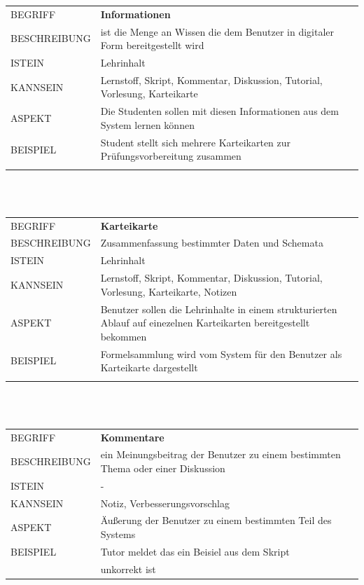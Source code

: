 \documentclass[12pt,a4paper]{article}
\begin{document}
\begin{tabular}{l p{12cm}}
BEGRIFF 	 & \textbf{Informationen} \\ 
BESCHREIBUNG & ist die Menge an Wissen die dem Benutzer in digitaler Form bereitgestellt wird\\ 
ISTEIN   	 & Lehrinhalt\\
KANNSEIN 	 & Lernstoff, Skript, Kommentar, Diskussion, Tutorial, Vorlesung, Karteikarte\\ 
ASPEKT   	 & Die Studenten sollen mit diesen Informationen aus dem System lernen können\\
BEISPIEL 	 & Student stellt sich mehrere Karteikarten zur Prüfungsvorbereitung zusammen\\\\
\hline
\end{tabular}\\\\  

\begin{tabular}{l p{12cm}}
BEGRIFF 	 & \textbf{Karteikarte} \\ 
BESCHREIBUNG & Zusammenfassung bestimmter Daten und Schemata\\ 
ISTEIN   	 & Lehrinhalt\\
KANNSEIN 	 & Lernstoff, Skript, Kommentar, Diskussion, Tutorial, Vorlesung, Karteikarte, Notizen\\ 
ASPEKT   	 & Benutzer sollen die Lehrinhalte in einem strukturierten Ablauf auf einezelnen Karteikarten bereitgestellt bekommen\\
BEISPIEL 	 & Formelsammlung wird vom System für den Benutzer als Karteikarte 			   dargestellt\\\\
\hline
\end{tabular}\\\\  

\begin{tabular}{l p{12cm}}
BEGRIFF 	 & \textbf{Kommentare} \\ 
BESCHREIBUNG & ein Meinungsbeitrag der Benutzer zu einem bestimmten Thema oder einer Diskussion\\ 
ISTEIN   	 & -\\
KANNSEIN 	 & Notiz, Verbesserungsvorschlag\\ 
ASPEKT   	 & Äußerung der Benutzer zu einem bestimmten Teil des Systems\\
BEISPIEL 	 & Tutor meldet das ein Beisiel aus dem Skript\\
			 & unkorrekt ist\\
\hline
\end{tabular}\\\\  
\end{document}
